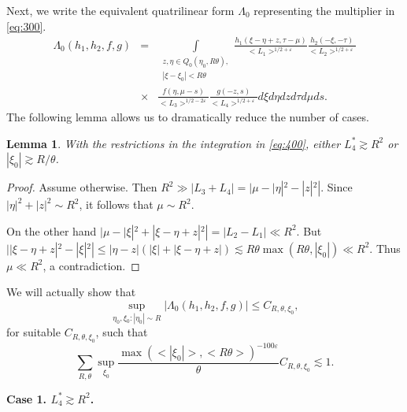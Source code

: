 \documentclass[draft,11pt,leqno]{amsart}
\newtheorem{lemma}{Lemma}
\newcommand{\ve}{\varepsilon}
\newcommand{\La}{\Lambda}
\newcommand{\intl}{\int\limits}
\newcommand{\suml}{\sum\limits}
\newcommand{\supl}{\sup\limits}
\newcommand{\f}{\displaystyle\frac}
\newcommand{\lfour}{{L_4^{*}}}
\begin{document}
Next,  we write the equivalent quatrilinear
form $\La_0$  representing the multiplier in \eqref{eq:300}.
\begin{eqnarray}
\label{eq:400}
\La_0(h_1,h_2,f,g) &=&
\intl_{
\begin{array}{l}
 z,\eta\in Q_0(\eta_0,R\theta),\\
|\xi-\xi_0|< R\theta
\end{array}}
\f{h_1(\xi-\eta+z,\tau-\mu)}{<L_1>^
{1/2+\ve}} \f{h_2(-\xi,-\tau)}{<L_2>^{1/2+\ve}}  \\
&\times& \f{f(\eta,\mu-s)}{<L_3>^{1/2-2\ve}}
\f{g(-z,s)}{<L_4>^{1/2+\ve}}
d\xi d\eta dz d\tau d\mu ds.
\nonumber
\end{eqnarray}
The following lemma allows us to dramatically reduce the number of cases.
\begin{lemma}
\label{le:claim1}
With the restrictions in the integration  in \eqref{eq:400}, either $\lfour\gtrsim R^2$ or $|\xi_0|\gtrsim R/\theta$.
\end{lemma}
\begin{proof}
Assume otherwise. Then $R^2\gg |L_3+L_4|=|\mu-|\eta|^2-|z|^2|$. Since $|\eta|^2+|z|^2\sim R^2$,
it follows that $\mu\sim R^2$.

On the other hand $|\mu-|\xi|^2+|\xi-\eta+z|^2|=|L_2-L_1|\ll R^2$.
But $||\xi-\eta+z|^2-|\xi|^2|\leq |\eta-z| (|\xi|+|\xi-\eta+z|)\lesssim
R\theta\max(R\theta,|\xi_0|)\ll R^2$.
Thus $\mu\ll R^2$, a contradiction.
\end{proof}
We will actually show that
$$
\supl_{\eta_0,\xi_0:|\eta_0|\sim R}
|\La_0(h_1,h_2,f,g)|\leq C_{R,\theta,\xi_0},
$$
for suitable $C_{R,\theta,\xi_0}$, such that
\begin{equation}
\label{eq:500}
\suml_{R,\theta} \supl_{\xi_0}\f{\max(<|\xi_0|>,<R\theta>)^{-100\ve}}{\theta} C_{R,\theta,\xi_0}\lesssim 1.
\end{equation}
\vspace{.5cm}
\begin{center}
{\large\bf Case 1. $\lfour\gtrsim R^2$.}
\end{center}
\vspace{.5cm}
\end{document}
